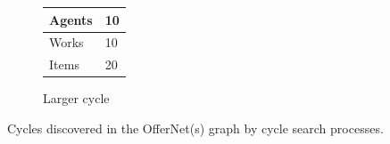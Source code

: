 \documentclass{article}
\begin{document}
\begin{figure}[H]
\begin{subfigure}{0.38\textwidth}
      \caption{Larger cycle}
      \scriptsize
      \begin{tabular}{ | L{2 cm} | L{0.5 cm} | }
      \hline
      Agents & 10  \\ \hline
      Works & 10  \\ \hline
      Items & 20  \\ \hline
      \end{tabular}
      \label{fig:cycle-larger-with-agents}
    \end{subfigure}
    \caption{Cycles discovered in the OfferNet(s) graph by cycle search processes.}
    \label{fig:cycle-search}
\end{figure}
\end{document}
